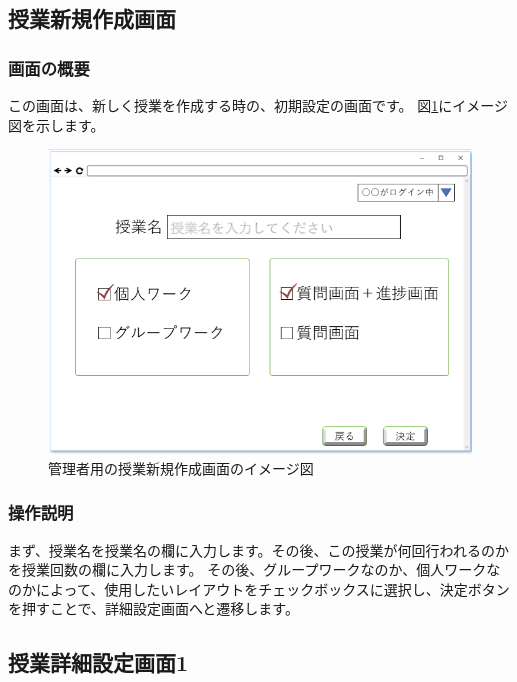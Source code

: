 \newpage

\subsection{授業新規作成画面}
\subsubsection{画面の概要}
この画面は、新しく授業を作成する時の、初期設定の画面です。
図\ref{fig:10}にイメージ図を示します。

\begin{figure}[htbp]
  \begin{center}
    \includegraphics[width=1\linewidth,clip]{./img/10.png}
    \caption{管理者用の授業新規作成画面のイメージ図}\label{fig:10}
  \end{center}
\end{figure}

\subsubsection{操作説明}
まず、授業名を授業名の欄に入力します。その後、この授業が何回行われるのかを授業回数の欄に入力します。
その後、グループワークなのか、個人ワークなのかによって、使用したいレイアウトをチェックボックスに選択し、決定ボタンを押すことで、詳細設定画面へと遷移します。

\newpage

\subsection{授業詳細設定画面1}
